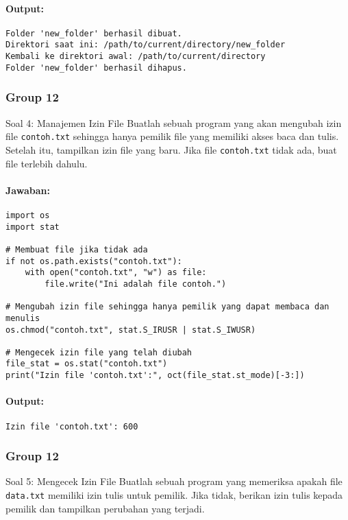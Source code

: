 \documentclass[12pt]{article}
\begin{document}
\paragraph{Output:}
\begin{verbatim}
Folder 'new_folder' berhasil dibuat.
Direktori saat ini: /path/to/current/directory/new_folder
Kembali ke direktori awal: /path/to/current/directory
Folder 'new_folder' berhasil dihapus.
\end{verbatim}

\subsubsection{Group 12}
{Soal 4: Manajemen Izin File}
Buatlah sebuah program yang akan mengubah izin file \texttt{contoh.txt} sehingga hanya pemilik file yang memiliki akses baca dan tulis. Setelah itu, tampilkan izin file yang baru. Jika file \texttt{contoh.txt} tidak ada, buat file terlebih dahulu.

\paragraph{Jawaban:}
\begin{verbatim}
import os
import stat

# Membuat file jika tidak ada
if not os.path.exists("contoh.txt"):
    with open("contoh.txt", "w") as file:
        file.write("Ini adalah file contoh.")

# Mengubah izin file sehingga hanya pemilik yang dapat membaca dan menulis
os.chmod("contoh.txt", stat.S_IRUSR | stat.S_IWUSR)

# Mengecek izin file yang telah diubah
file_stat = os.stat("contoh.txt")
print("Izin file 'contoh.txt':", oct(file_stat.st_mode)[-3:])
\end{verbatim}

\paragraph{Output:}
\begin{verbatim}
Izin file 'contoh.txt': 600
\end{verbatim}

\subsubsection{Group 12}
{Soal 5: Mengecek Izin File}
Buatlah sebuah program yang memeriksa apakah file \texttt{data.txt} memiliki izin tulis untuk pemilik. Jika tidak, berikan izin tulis kepada pemilik dan tampilkan perubahan yang terjadi.
\end{document}
